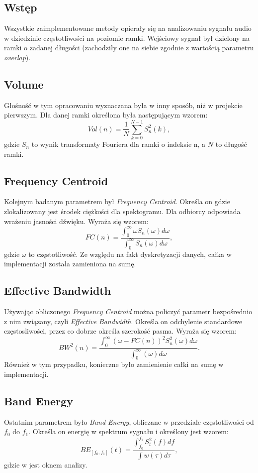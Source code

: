 \documentclass{article}
\begin{document}
\subsection{Wstęp}
Wszystkie zaimplementowane metody opierały się na analizowaniu sygnału audio w dziedzinie częstotliwości na poziomie ramki. Wejściowy sygnał był dzielony na ramki o zadanej długości (zachodziły one na siebie zgodnie z wartością parametru \textit{overlap}).

\subsection{Volume}
Głośność w tym opracowaniu wyznaczana była w inny sposób, niż w projekcie pierwszym. Dla danej ramki określona była następującym wzorem:
$$Vol(n) = \frac{1}{N}\sum^{N-1}_{k=0}S_n^2(k),$$
gdzie $S_n$ to wynik transformaty Fouriera dla ramki o indeksie n, a $N$ to długość ramki.

\subsection{Frequency Centroid}
Kolejnym badanym parametrem był \textit{Frequency Centroid}. Określa on gdzie zlokalizowany jest środek ciężkości dla spektogramu. Dla odbiorcy odpowiada wrażeniu jasności dźwięku. Wyraża się wzorem:
$$FC(n)=\frac{\int_{0}^{\infty} \omega S_n(\omega)d\omega}{\int_0^\infty S_n(\omega)d\omega},$$
gdzie $\omega$ to częstotliwość. Ze względu na fakt dyskretyzacji danych, całka w implementacji została zamieniona na sumę.

\subsection{Effective Bandwidth}
Używając obliczonego \textit{Frequency Centroid} można policzyć parametr bezpośrednio z nim związany, czyli \textit{Effective Bandwidth}. Określa on odchylenie standardowe częstosliwości, przez co dobrze określa szerokość pasma. Wyraża się wzorem:
$$BW^2(n)=\frac{\int_0^\infty(\omega-FC(n))^2S_n^2(\omega)d\omega}{\int_0^\infty(\omega)d\omega}.$$
Również w tym przypadku, konieczne było zamienienie całki na sumę w implementacji.

\subsection{Band Energy}
Ostatnim parametrem było \textit{Band Energy}, obliczane w przedziale częstotliwości od $f_0$ do $f_1$. Określa on energię w spektrum sygnału i określony jest wzorem:
$$BE_{[f_0,f_1]}(t)=\frac{\int_{f_0}^{f_1}S_t^2(f)df}{\int w(\tau)d\tau},$$
gdzie w jest oknem analizy.
\end{document}
